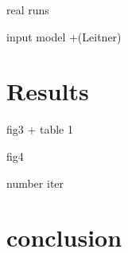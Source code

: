 \documentclass{beamer}
\begin{document}
\begin{frame}
	real runs
\end{frame}

\begin{frame}
 	input model +(Leitner)
\end{frame}

\section{Results}

\begin{frame}
	fig3 + table 1
\end{frame}

\begin{frame}
	fig4 
\end{frame}

\begin{frame}
	number iter
\end{frame}
\section{conclusion}
\end{document}
